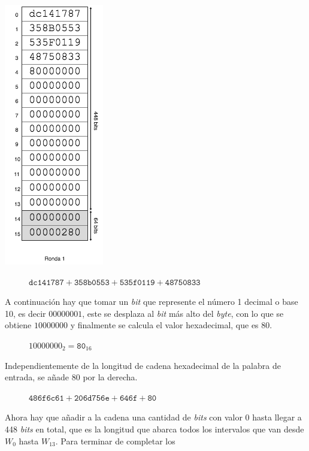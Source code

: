 \documentclass{article}
\begin{document}
        \noindent\begin{minipage}{0.23\textwidth}
        \includegraphics[scale=0.59]{img/Bitcoin_block_SHA_256_W0_W15_ronda_1}
        \end{minipage}
        \hfill
        \begin{minipage}{0.67\textwidth}
        \begin{figure}[H]
        \centering
            $\texttt{dc141787} + \texttt{358b0553} + \texttt{535f0119} + \texttt{48750833}$
        \end{figure}
        A continuación hay que tomar un \textit{bit} que represente el número 1 decimal o base 10, es decir $00000001$, este se desplaza al \textit{bit} más alto del \textit{byte}, con lo que se obtiene $10000000$ y finalmente se calcula el valor hexadecimal, que es $80$.
            \begin{figure}[H]
            \centering
                $10000000_{2} = \texttt{80}_{16}$
            \end{figure}
        Independientemente de la longitud de cadena hexadecimal de la palabra de entrada, se añade $80$ por la derecha.
            \begin{figure}[H]
            \centering
                $\texttt{486f6c61} + \texttt{206d756e} + \texttt{646f} + \texttt{80}$
            \end{figure}
        Ahora hay que añadir a la cadena una cantidad de \textit{bits} con valor $0$ hasta llegar a 448 \textit{bits} en total, que es la longitud que abarca todos los intervalos que van desde $W_{0}$ hasta $W_{13}$. Para terminar de completar los
        \end{minipage}
        
\end{document}
